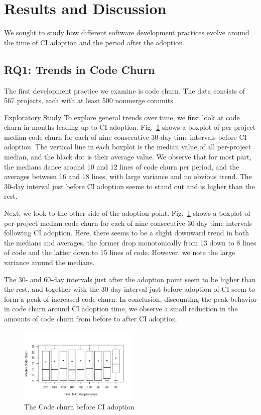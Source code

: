 \documentclass[conference]{IEEEtran}
\begin{document}
\section{Results and Discussion}

We sought to study how different software development practices evolve around the time of CI adoption and the period after the adoption.


\subsection{RQ1: Trends in Code Churn}

The first development practice we examine is code churn.
The data consists of 567 projects, each with at least 500 nonmerge commits.

\noindent \underline{Exploratory Study} To explore general trends over time, we first look at code churn in months leading up to CI adoption.
Fig.~\ref{Fig:CodeChurnBefore} shows a boxplot of per-project median code churn for each of nine consecutive 30-day time intervals before CI adoption.
The vertical line in each boxplot is the median value of all per-project median, and the black dot is their average value.
We observe that for most part, the medians dance around 
10 and 12 lines of code churn per period, and the averages between 16 and 18 lines, with large variance and no obvious trend. The 30-day interval just before CI adoption seems to stand out and is higher than the rest.

Next, we look to the other side of the adoption point. Fig.~\ref{Fig:CodeChurnBefore} shows a boxplot of per-project median code churn for each of nine consecutive 30-day time intervals following CI adoption.
Here,  there seems to be a slight downward trend in both the medians and averages, the former drop monotonically from 13 down to 8 lines of code and the latter down to 15 lines of code.
However, we note the large variance around the medians.

The 30- and 60-day intervals just after the adoption point seem to be higher than the rest, and together with the 30-day interval just before adoption of CI seem to form a peak of increased code churn.
In conclusion, discounting the peak behavior in code churn around CI adoption time, we observe a small reduction in the amounts of code churn from before to after CI adoption.


\begin{figure}[!t]
\centering
\includegraphics[width=0.5\textwidth]{churn_before.pdf}
\caption{The Code churn before CI adoption}
\label{Fig:CodeChurnBefore}
\end{figure}
\end{document}
